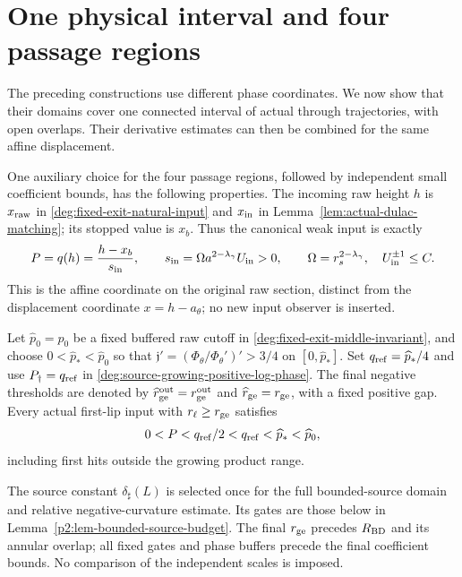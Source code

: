 \section{One physical interval and four passage regions}

The preceding constructions use different phase coordinates. We now show
that their domains cover one connected interval of actual through
trajectories, with open overlaps. Their derivative estimates can then
be combined for the same affine displacement.

\begin{lemma}
\label{p2:lem-joint-entrance}
One auxiliary choice for the four passage regions, followed by
independent small coefficient bounds, has the following properties.
The incoming raw height $h$ is $x_{\rm raw}$ in
\eqref{deg:fixed-exit-natural-input} and $x_{\rm in}$ in
Lemma~\ref{lem:actual-dulac-matching}; its stopped value is $x_b$.
Thus the canonical weak input is exactly
\begin{equation}\label{p2:joint-raw-input}
 P=q(h)=\frac{h-x_b}{s_{\rm in}},\qquad
 s_{\rm in}=\Omega a^{2-\lambda_\gamma}U_{\rm in}>0,
 \qquad \Omega=r_s^{2-\lambda_\gamma},\quad U_{\rm in}^{\pm1}\le C.
\end{equation}
This is the affine coordinate on the original raw section, distinct
from the displacement coordinate $x=h-a_\theta$; no new input
observer is inserted.

Let $\widehat p_0=p_0$ be a fixed buffered raw cutoff in
\eqref{deg:fixed-exit-middle-invariant}, and choose
$0<\widehat p_*<\widehat p_0$ so that
$\mathfrak j'=(\Phi_\theta/\Phi_\theta')'>3/4$ on
$[0,\widehat p_*]$. Set $q_{\rm ref}=\widehat p_*/4$ and use
$P_\dagger=q_{\rm ref}$ in
\eqref{deg:source-growing-positive-log-phase}. The final negative
thresholds are denoted by
$\widehat r_{\rm ge}^{\rm out}=r_{\rm ge}^{\rm out}$ and
$\widehat r_{\rm ge}=r_{\rm ge}$, with a fixed positive gap. Every
actual first-lip input with $r_\ell\ge r_{\rm ge}$ satisfies
\begin{equation}\label{p2:joint-entrance-buffer}
 0<P<q_{\rm ref}/2<q_{\rm ref}<\widehat p_*<\widehat p_0,
\end{equation}
including first hits outside the growing product range.

The source constant $\delta_\sharp(L)$ is selected once for the full
bounded-source domain and relative negative-curvature estimate. Its gates
are those below in Lemma~\ref{p2:lem-bounded-source-budget}.
The final $r_{\rm ge}$ precedes $R_{\rm BD}$ and its annular
overlap; all fixed gates and phase buffers precede the final coefficient
bounds. No comparison of the independent scales is imposed.
\end{lemma}
